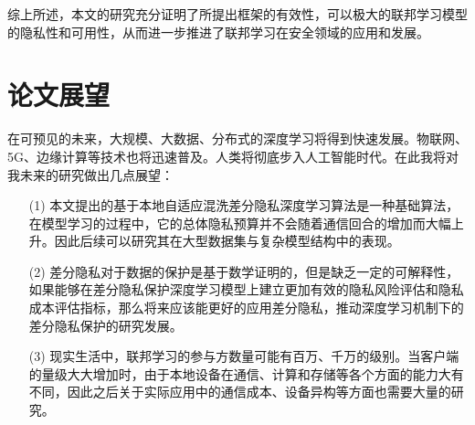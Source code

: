 综上所述，本文的研究充分证明了所提出框架的有效性，可以极大的联邦学习模型的隐私性和可用性，从而进一步推进了联邦学习在安全领域的应用和发展。

\section{论文展望}
在可预见的未来，大规模、大数据、分布式的深度学习将得到快速发展。物联网、5G、边缘计算等技术也将迅速普及。人类将彻底步入人工智能时代。在此我将对我未来的研究做出几点展望：
\begin{enumerate}
	\item [(1)] 本文提出的基于本地自适应混洗差分隐私深度学习算法是一种基础算法，在模型学习的过程中，它的总体隐私预算并不会随着通信回合的增加而大幅上升。因此后续可以研究其在大型数据集与复杂模型结构中的表现。
	\item [(2)] 差分隐私对于数据的保护是基于数学证明的，但是缺乏一定的可解释性，如果能够在差分隐私保护深度学习模型上建立更加有效的隐私风险评估和隐私成本评估指标，那么将来应该能更好的应用差分隐私，推动深度学习机制下的差分隐私保护的研究发展。
	\item [(3)] 现实生活中，联邦学习的参与方数量可能有百万、千万的级别。当客户端的量级大大增加时，由于本地设备在通信、计算和存储等各个方面的能力大有不同，因此之后关于实际应用中的通信成本、设备异构等方面也需要大量的研究。
\end{enumerate}

